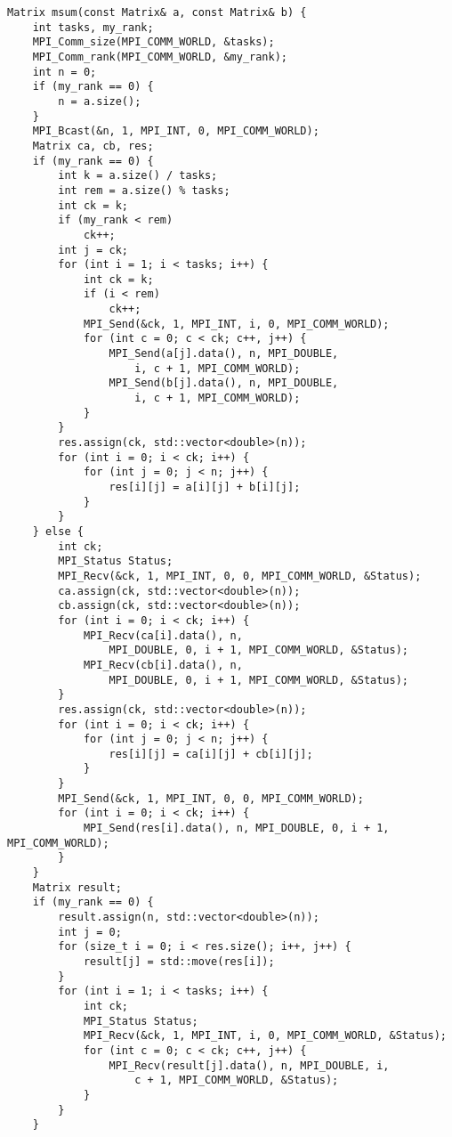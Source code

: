 \documentclass{report}
\begin{document}
\begin{lstlisting}
Matrix msum(const Matrix& a, const Matrix& b) {
    int tasks, my_rank;
    MPI_Comm_size(MPI_COMM_WORLD, &tasks);
    MPI_Comm_rank(MPI_COMM_WORLD, &my_rank);
    int n = 0;
    if (my_rank == 0) {
        n = a.size();
    }
    MPI_Bcast(&n, 1, MPI_INT, 0, MPI_COMM_WORLD);
    Matrix ca, cb, res;
    if (my_rank == 0) {
        int k = a.size() / tasks;
        int rem = a.size() % tasks;
        int ck = k;
        if (my_rank < rem)
            ck++;
        int j = ck;
        for (int i = 1; i < tasks; i++) {
            int ck = k;
            if (i < rem)
                ck++;
            MPI_Send(&ck, 1, MPI_INT, i, 0, MPI_COMM_WORLD);
            for (int c = 0; c < ck; c++, j++) {
                MPI_Send(a[j].data(), n, MPI_DOUBLE,
                    i, c + 1, MPI_COMM_WORLD);
                MPI_Send(b[j].data(), n, MPI_DOUBLE,
                    i, c + 1, MPI_COMM_WORLD);
            }
        }
        res.assign(ck, std::vector<double>(n));
        for (int i = 0; i < ck; i++) {
            for (int j = 0; j < n; j++) {
                res[i][j] = a[i][j] + b[i][j];
            }
        }
    } else {
        int ck;
        MPI_Status Status;
        MPI_Recv(&ck, 1, MPI_INT, 0, 0, MPI_COMM_WORLD, &Status);
        ca.assign(ck, std::vector<double>(n));
        cb.assign(ck, std::vector<double>(n));
        for (int i = 0; i < ck; i++) {
            MPI_Recv(ca[i].data(), n,
                MPI_DOUBLE, 0, i + 1, MPI_COMM_WORLD, &Status);
            MPI_Recv(cb[i].data(), n,
                MPI_DOUBLE, 0, i + 1, MPI_COMM_WORLD, &Status);
        }
        res.assign(ck, std::vector<double>(n));
        for (int i = 0; i < ck; i++) {
            for (int j = 0; j < n; j++) {
                res[i][j] = ca[i][j] + cb[i][j];
            }
        }
        MPI_Send(&ck, 1, MPI_INT, 0, 0, MPI_COMM_WORLD);
        for (int i = 0; i < ck; i++) {
            MPI_Send(res[i].data(), n, MPI_DOUBLE, 0, i + 1, MPI_COMM_WORLD);
        }
    }
    Matrix result;
    if (my_rank == 0) {
        result.assign(n, std::vector<double>(n));
        int j = 0;
        for (size_t i = 0; i < res.size(); i++, j++) {
            result[j] = std::move(res[i]);
        }
        for (int i = 1; i < tasks; i++) {
            int ck;
            MPI_Status Status;
            MPI_Recv(&ck, 1, MPI_INT, i, 0, MPI_COMM_WORLD, &Status);
            for (int c = 0; c < ck; c++, j++) {
                MPI_Recv(result[j].data(), n, MPI_DOUBLE, i,
                    c + 1, MPI_COMM_WORLD, &Status);
            }
        }
    }


\end{lstlisting}
\end{document}

